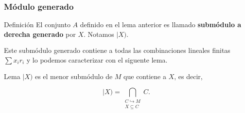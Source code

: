 \documentclass[notes=show]{beamer}%
\newenvironment{Defi}{\begin{block}{Definición}}{\end{block}}
\newenvironment{Lema}{\begin{block}{Lema}}{\end{block}}
\begin{document}
\bigskip%

\begin{frame}%


\bigskip%
\frametitle{Módulo generado}%


\begin{Defi}
\bigskip El conjunto $A$ definido en el lema anterior es llamado
\textbf{submódulo a derecha generado }por $X$. Notamos $|X)$.
\end{Defi}

Este submódulo generado contiene a todas las combinaciones lineales
finitas $\sum x_{i}r_{i}$ y lo podemos caracterizar con el siguente lema.

\begin{Lema}
$|X)$ es el menor submódulo de $M$ que contiene a $X$, es decir,%

\[
|X)=%
{\displaystyle\bigcap\limits_{\substack{C\hookrightarrow M\\X\subseteq C}}}
C\text{.}%
\]

\end{Lema}

\bigskip%

\transboxout
\end{frame}%


\bigskip
\end{document}

